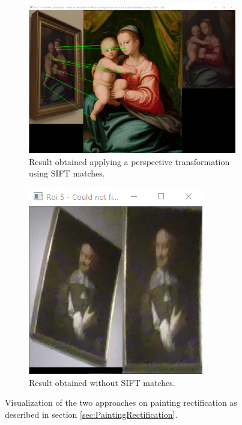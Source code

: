 \documentclass[10pt,twocolumn,letterpaper]{article}
\begin{document}
\begin{figure}[t]
\begin{subfigure}[b]{\linewidth}
    \begin{center}
    \includegraphics[width=\linewidth]{images/image10.png}
    \end{center}
    \caption{Result obtained applying a perspective transformation using SIFT matches.}
    \label{fig:PaintingRectificationSIFT}
\end{subfigure}
\begin{subfigure}[b]{\linewidth}
    \begin{center}
    \includegraphics[width=0.6\linewidth]{images/image7.png}
    \end{center}
    \caption{Result obtained without SIFT matches.}
    \label{fig:PaintingRectificationNoSIFT}
\end{subfigure}
\caption{Visualization of the two approaches on painting rectification as described in section \ref{sec:PaintingRectification}.}
\label{fig:PaintingRectificationImages}
\end{figure}
\end{document}

